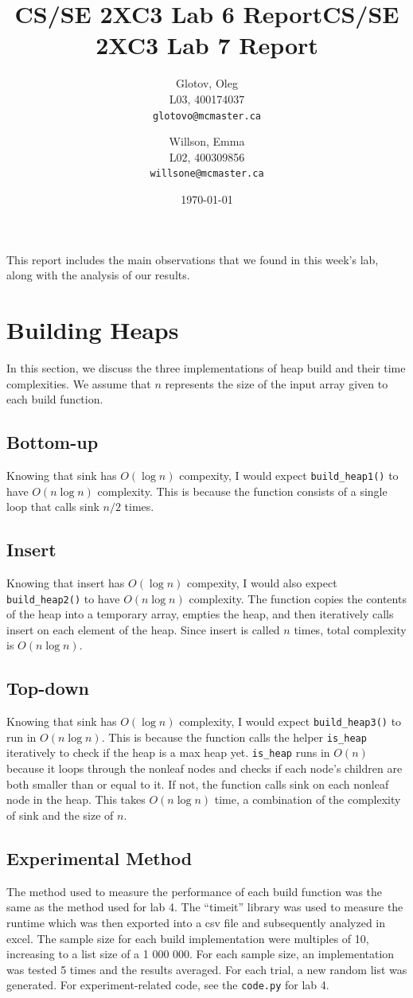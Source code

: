 \documentclass[12pt]{article}
\title{CS/SE 2XC3 Lab 6 Report}
\title{CS/SE 2XC3 Lab 7 Report}
\author{
  Glotov, Oleg\\ L03, 400174037\\
  \texttt{glotovo@mcmaster.ca}
  \and
  Willson, Emma\\ L02, 400309856\\
  \texttt{willsone@mcmaster.ca}
  }
\date{\today}
\begin{document}
\maketitle

This report includes the main observations that we found in this week's lab, along with the analysis of our results.

\newpage 
\section{Building Heaps}
In this section, we discuss the three implementations of heap build and their time complexities. We assume that $n$ represents the size of the input array given to each build function.
\subsection{Bottom-up}
Knowing that sink has $O(\log{n})$ compexity, I would expect \verb+build_heap1()+ to have $O(n\log{n})$ complexity. This is because the function consists of a single loop that calls sink $n/2$ times. 
\subsection{Insert}
Knowing that insert has $O(\log{n})$ compexity, I would also expect \verb+build_heap2()+ to have $O(n\log{n})$ complexity. The function copies the contents of the heap into a temporary array, empties the heap, and then iteratively calls insert on each element of the heap. Since insert is called $n$ times, total complexity is $O(n\log{n})$.
\subsection{Top-down}
Knowing that sink has $O(\log{n})$ complexity, I would expect \verb+build_heap3()+ to run in $O(n\log{n})$. This is because the function calls the helper \verb+is_heap+ iteratively to check if the heap is a max heap yet. \verb+is_heap+ runs in $O(n)$ because it loops through the nonleaf nodes and checks if each node's children are both smaller than or equal to it. If not, the function calls sink on each nonleaf node in the heap. This takes $O(n\log{n})$ time, a combination of the complexity of sink and the size of $n$. 
\subsection{Experimental Method}
The method used to measure the performance of each build function was the same as the method used for lab 4. The “timeit” library was used to measure the runtime which was then exported into a csv file and subsequently analyzed in excel. The sample size for each build implementation were multiples of 10, increasing to a list size of a 1 000 000. For each sample size, an implementation was tested 5 times and the results averaged. For each trial, a new random list was generated. For experiment-related code, see the \verb+code.py+ for lab 4.
\end{document}
